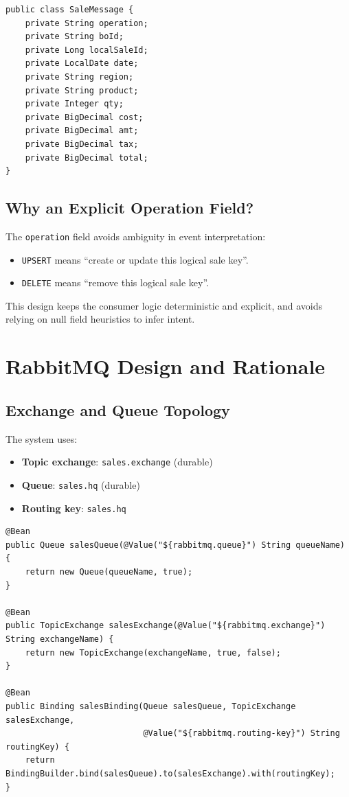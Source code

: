\documentclass[11pt,a4paper]{article}
\begin{document}
\begin{lstlisting}[style=javastyle,caption={Simplified event contract (BO side)}]
public class SaleMessage {
    private String operation;
    private String boId;
    private Long localSaleId;
    private LocalDate date;
    private String region;
    private String product;
    private Integer qty;
    private BigDecimal cost;
    private BigDecimal amt;
    private BigDecimal tax;
    private BigDecimal total;
}
\end{lstlisting}

\subsection{Why an Explicit Operation Field?}
The \texttt{operation} field avoids ambiguity in event interpretation:
\begin{itemize}[leftmargin=*]
  \item \texttt{UPSERT} means ``create or update this logical sale key''.
  \item \texttt{DELETE} means ``remove this logical sale key''.
\end{itemize}
This design keeps the consumer logic deterministic and explicit, and avoids relying on null field heuristics to infer intent.

\section{RabbitMQ Design and Rationale}
\subsection{Exchange and Queue Topology}
The system uses:
\begin{itemize}[leftmargin=*]
  \item \textbf{Topic exchange}: \texttt{sales.exchange} (durable)
  \item \textbf{Queue}: \texttt{sales.hq} (durable)
  \item \textbf{Routing key}: \texttt{sales.hq}
\end{itemize}

\begin{lstlisting}[style=javastyle,caption={HO queue/exchange/binding configuration}]
@Bean
public Queue salesQueue(@Value("${rabbitmq.queue}") String queueName) {
    return new Queue(queueName, true);
}

@Bean
public TopicExchange salesExchange(@Value("${rabbitmq.exchange}") String exchangeName) {
    return new TopicExchange(exchangeName, true, false);
}

@Bean
public Binding salesBinding(Queue salesQueue, TopicExchange salesExchange,
                            @Value("${rabbitmq.routing-key}") String routingKey) {
    return BindingBuilder.bind(salesQueue).to(salesExchange).with(routingKey);
}
\end{lstlisting}
\end{document}
